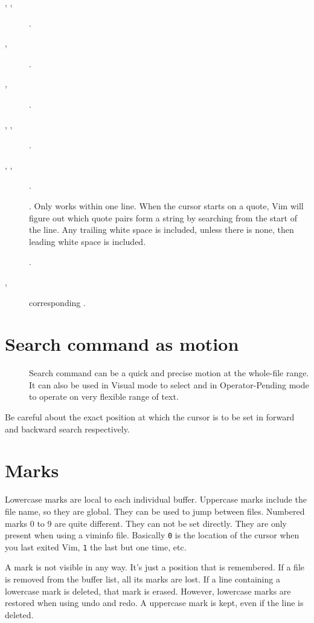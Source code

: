 \begin{description}
  \item[\vphantom{(}, \vphantom{)}, ] .
  \item[, ] .
  \item[, ] .
  \item[, , ] .
  \item[, , ] .
  \item[] . Only works within one line. When the cursor starts on a quote, Vim will figure out which quote pairs form a string by searching from the start of the line. Any trailing white space is included, unless there is none, then leading white space is included.
  \item[] .
  \item[, ] corresponding .
\end{description}

\section{Search command as motion}
\begin{description}
  \item[] Search command can be a quick and precise motion at the whole-file range. It can also be used in Visual mode to select and in Operator-Pending mode to operate on very flexible range of text.
\end{description}
Be careful about the exact position at which the cursor is to be set in forward and backward search respectively.
\section{Marks}
Lowercase marks are local to each individual buffer. Uppercase marks include the file name, so they are global. They can be used to jump between files.
Numbered marks 0 to 9 are quite different.  They can not be set directly. They are only present when using a viminfo file.
Basically \verb|0| is the location of the cursor when you last exited Vim, \verb|1| the last but one
time, etc.

A mark is not visible in any way. It's just a position that is remembered.
If a file is removed from the buffer list, all its marks are lost.
If a line containing a lowercase mark is deleted, that mark is erased.
However, lowercase marks are restored when using undo and redo.
A uppercase mark is kept, even if the line is deleted.


